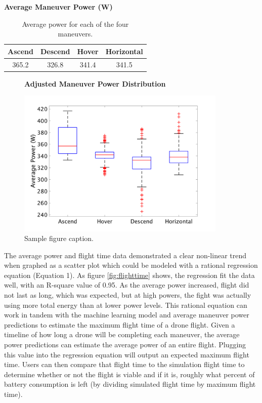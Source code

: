\documentclass{article}
\begin{document}
\begin{table}[!h]
  \centering
  \large{\textbf{Average Maneuver Power (W)}}\par\medskip
  \begin{tabular}{cccc}
    \toprule
    \cmidrule(r){1-2}
    Ascend     & Descend     & Hover & Horizontal \\
    \midrule
    365.2 & 326.8  & 341.4 & 341.5    \\
    \bottomrule
  \end{tabular} \bigskip
  \caption{Average power for each of the four maneuvers.}
  \label{tab:man}
\end{table}

\begin{figure}[!h]
  \centering
  \large{\textbf{Adjusted Maneuver Power Distribution}}\par
  \includegraphics[width = 100mm]{images/powerfinal.png}
  \caption{Sample figure caption.}
  \label{fig:powerfinal}
\end{figure}

The average power and flight time data demonstrated a clear non-linear trend when graphed as a scatter plot which could be modeled with a rational regression equation (Equation 1). As figure \ref{fig:flighttime} shows, the regression fit the data well, with an R-square value of 0.95. As the average power increased, flight did not last as long, which was expected, but at high powers, the fight was actually using more total energy than at lower power levels. This rational equation can work in tandem with the machine learning model and average maneuver power predictions to estimate the maximum flight time of a drone flight. Given a timeline of how long a drone will be completing each maneuver, the average power predictions can estimate the average power of an entire flight. Plugging this value into the regression equation will output an expected maximum flight time. Users can then compare that flight time to the simulation flight time to determine whether or not the flight is viable and if it is, roughly what percent of battery consumption is left (by dividing simulated flight time by maximum flight time).
\end{document}
